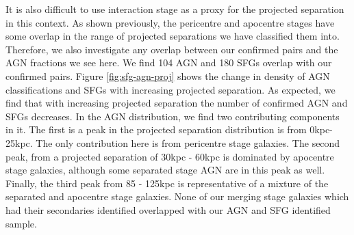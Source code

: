 It is also difficult to use interaction stage as a proxy for the projected separation in this context. As shown previously, the pericentre and apocentre stages have some overlap in the range of projected separations we have classified them into. Therefore, we also investigate any overlap between our confirmed pairs and the AGN fractions we see here. We find 104 AGN and 180 SFGs overlap with our confirmed pairs. Figure \ref{fig:sfg-agn-proj} shows the change in density of AGN classifications and SFGs with increasing projected separation. As expected, we find that with increasing projected separation the number of confirmed AGN and SFGs decreases. In the AGN distribution, we find two contributing components in it. The first is a peak in the projected separation distribution is from 0kpc-25kpc. The only contribution here is from pericentre stage galaxies. The second peak, from a projected separation of 30kpc - 60kpc is dominated by apocentre stage galaxies, although some separated stage AGN are in this peak as well. Finally, the third peak from 85 - 125kpc is representative of a mixture of the separated and apocentre stage galaxies. None of our merging stage galaxies which had their secondaries identified overlapped with our AGN and SFG identified sample.

